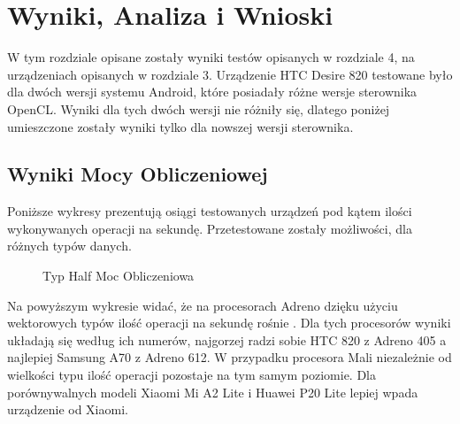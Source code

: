 \section[Wyniki, Analiza i Wnioski]{Wyniki, Analiza i Wnioski}
W tym rozdziale opisane zostały wyniki testów opisanych w rozdziale 4, na urządzeniach opisanych w rozdziale 3. Urządzenie HTC Desire 820 testowane było dla dwóch wersji systemu Android, które posiadały różne wersje sterownika OpenCL. Wyniki dla tych dwóch wersji nie różniły się, dlatego poniżej umieszczone zostały wyniki tylko dla nowszej wersji sterownika.
\subsection[Wyniki Mocy Obliczeniowej]{Wyniki Mocy Obliczeniowej}
Poniższe wykresy prezentują osiągi testowanych urządzeń pod kątem ilości wykonywanych operacji na sekundę. Przetestowane zostały możliwości, dla różnych typów danych.
\begin{figure}[H]
\caption{Typ Half Moc Obliczeniowa}
\end{figure}
Na powyższym wykresie widać, że na procesorach Adreno dzięku użyciu wektorowych typów ilość operacji na sekundę rośnie . Dla tych procesorów wyniki układają się według ich numerów, najgorzej radzi sobie HTC 820 z Adreno 405 a najlepiej Samsung A70 z Adreno 612. W przypadku procesora Mali niezależnie od wielkości typu ilość operacji pozostaje na tym samym poziomie. Dla porównywalnych modeli Xiaomi Mi A2 Lite i Huawei P20 Lite lepiej wpada urządzenie od Xiaomi.

